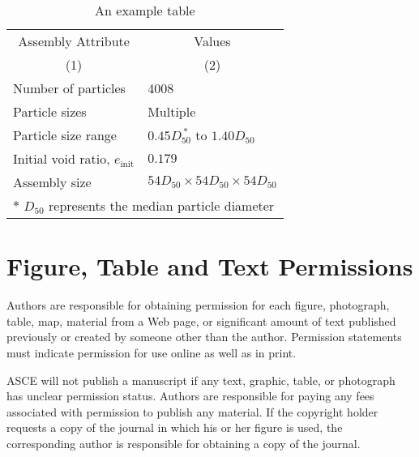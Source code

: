 \documentclass[Journal,letterpaper]{ascelike-new}
\begin{document}
\begin{table}
      \caption{An example table}
      \label{table:assembly}
      \centering
      \small
      \renewcommand{\arraystretch}{1.25}
      \begin{tabular}{l l}
            \hline\hline
            \multicolumn{1}{c}{Assembly Attribute}  &
            \multicolumn{1}{c}{Values}                                                           \\
            \multicolumn{1}{c}{(1)}                 &
            \multicolumn{1}{c}{(2)}                                                              \\
            \hline
            Number of particles                     & 4008                                       \\
            Particle sizes                          & Multiple                                   \\
            Particle size range                     & $0.45D_{50}^{\:\ast}$ to $1.40D_{50}$      \\
            Initial void ratio, $e_{\mathrm{init}}$ & $0.179$                                    \\
            Assembly size                           & $54D_{50} \times 54D_{50} \times 54D_{50}$ \\
            \hline
            \multicolumn{2}{l}{$\ast$ $D_{50}$ represents the median particle diameter}          \\
            \hline\hline
      \end{tabular}
      \normalsize
\end{table}

\section{Figure, Table and Text Permissions}

Authors are responsible for obtaining permission for each figure, photograph, table, map, material from a Web page, or significant amount of text published previously or created by someone other than the author. Permission statements must indicate permission for use online as well as in print.

ASCE will not publish a manuscript if any text, graphic, table, or photograph has unclear permission status. Authors are responsible for paying any fees associated with permission to publish any material. If the copyright holder requests a copy of the journal in which his or her figure is used, the corresponding author is responsible for obtaining a copy of the journal.
\end{document}
